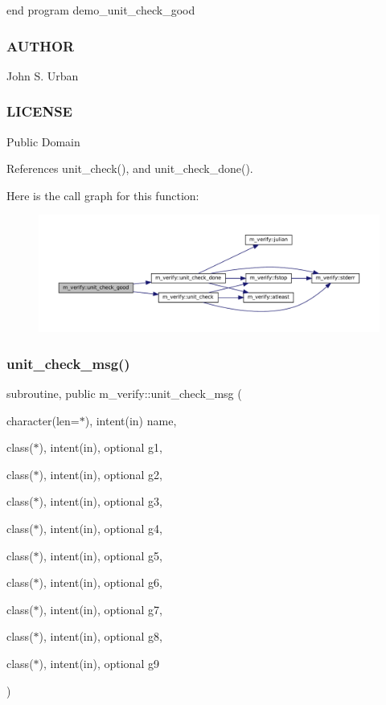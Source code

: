 end program demo\+\_\+unit\+\_\+check\+\_\+good

\subsubsection*{A\+U\+T\+H\+OR}

John S. Urban \subsubsection*{L\+I\+C\+E\+N\+SE}

Public Domain 

References unit\+\_\+check(), and unit\+\_\+check\+\_\+done().

Here is the call graph for this function\+:\nopagebreak
\begin{figure}[H]
\begin{center}
\leavevmode
\includegraphics[width=350pt]{namespacem__verify_a9d5ed59a1ac977dd7ab23e0d1fb54de4_cgraph}
\end{center}
\end{figure}
\mbox{\label{namespacem__verify_a74ea8b4574606c4f72e97b115375fc9b}} 
\subsubsection{\texorpdfstring{unit\+\_\+check\+\_\+msg()}{unit\_check\_msg()}}
{\footnotesize\ttfamily subroutine, public m\+\_\+verify\+::unit\+\_\+check\+\_\+msg (\begin{DoxyParamCaption}\item[{character(len=$\ast$), intent(in)}]{name,  }\item[{class($\ast$), intent(in), optional}]{g1,  }\item[{class($\ast$), intent(in), optional}]{g2,  }\item[{class($\ast$), intent(in), optional}]{g3,  }\item[{class($\ast$), intent(in), optional}]{g4,  }\item[{class($\ast$), intent(in), optional}]{g5,  }\item[{class($\ast$), intent(in), optional}]{g6,  }\item[{class($\ast$), intent(in), optional}]{g7,  }\item[{class($\ast$), intent(in), optional}]{g8,  }\item[{class($\ast$), intent(in), optional}]{g9 }\end{DoxyParamCaption})}




